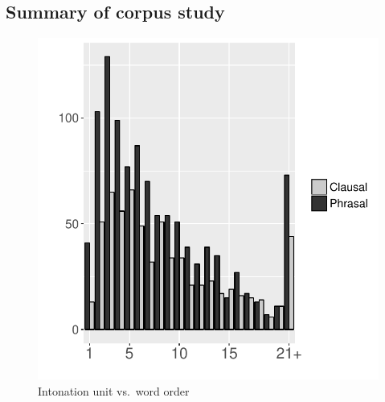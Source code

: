 %
%


\subsection{Summary of corpus study}

\begin{figure}
\centering
	\begin{center}
	\includegraphics[width=.5\textwidth]{figure/IUWO.pdf}
	\caption{Intonation unit vs.~word order}
	\label{IUWOF}
	\end{center}
\end{figure}



